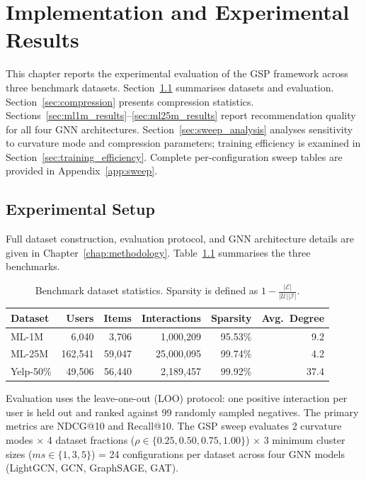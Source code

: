 ﻿\chapter{Implementation and Experimental Results}
\label{chap:results}
\graphicspath{{../figures/}{Chapter4/}}

This chapter reports the experimental evaluation of the GSP framework across three benchmark datasets. Section~\ref{sec:exp_setup} summarises datasets and evaluation. Section~\ref{sec:compression} presents compression statistics. Sections~\ref{sec:ml1m_results}--\ref{sec:ml25m_results} report recommendation quality for all four GNN architectures. Section~\ref{sec:sweep_analysis} analyses sensitivity to curvature mode and compression parameters; training efficiency is examined in Section~\ref{sec:training_efficiency}. Complete per-configuration sweep tables are provided in Appendix~\ref{app:sweep}.

\section{Experimental Setup}
\label{sec:exp_setup}

Full dataset construction, evaluation protocol, and GNN architecture details are given in Chapter~\ref{chap:methodology}. Table~\ref{tab:dataset_summary} summarises the three benchmarks.

\begin{table}[ht]
\centering
\caption{Benchmark dataset statistics. Sparsity is defined as $1 - \frac{|\mathcal{E}|}{|\mathcal{U}||\mathcal{I}|}$.}
\label{tab:dataset_summary}
\setlength{\tabcolsep}{6pt}
\begin{tabular}{l r r r r r}
\toprule
Dataset   & Users     & Items      & Interactions   & Sparsity  & Avg.\ Degree \\
\midrule
ML-1M     & 6{,}040   & 3{,}706    & 1{,}000{,}209  & 95.53\%   & 9.2 \\
ML-25M    & 162{,}541 & 59{,}047   & 25{,}000{,}095 & 99.74\%   & 4.2 \\
Yelp-50\% & 49{,}506  & 56{,}440   & 2{,}189{,}457  & 99.92\%   & 37.4 \\
\bottomrule
\end{tabular}
\end{table}

Evaluation uses the leave-one-out (LOO) protocol: one positive interaction per user is held out and ranked against 99 randomly sampled negatives. The primary metrics are NDCG@10 and Recall@10. The GSP sweep evaluates 2 curvature modes $\times$ 4 dataset fractions ($\rho \in \{0.25, 0.50, 0.75, 1.00\}$) $\times$ 3 minimum cluster sizes ($ms \in \{1, 3, 5\}$) = 24 configurations per dataset across four GNN models (LightGCN, GCN, GraphSAGE, GAT).

